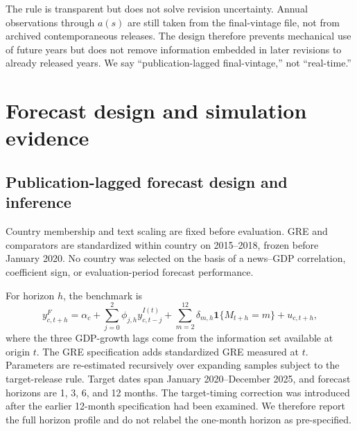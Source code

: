 \documentclass[preprint,12pt,authoryear]{elsarticle}
\begin{document}
The rule is transparent but does not solve revision uncertainty. Annual
observations through $a(s)$ are still taken from the final-vintage file, not
from archived contemporaneous releases. The design therefore prevents
mechanical use of future years but does not remove information embedded in
later revisions to already released years. We say ``publication-lagged
final-vintage,'' not ``real-time.''

\section{Forecast design and simulation evidence}

\subsection{Publication-lagged forecast design and inference}

Country membership and text scaling are fixed before evaluation. GRE and
comparators are standardized within country on 2015--2018, frozen before
January 2020. No country was selected on the basis of a news--GDP correlation,
coefficient sign, or evaluation-period forecast performance.

For horizon $h$, the benchmark is
\begin{equation}
y^F_{c,t+h} = \alpha_c + \sum_{j=0}^{2}\phi_{j,h} y^{I(t)}_{c,t-j}
+ \sum_{m=2}^{12}\delta_{m,h}\mathbf{1}\{M_{t+h}=m\} + u_{c,t+h},
\label{eq:benchmark}
\end{equation}
where the three GDP-growth lags come from the information set available at
origin $t$. The GRE specification adds standardized GRE measured at $t$.
Parameters are re-estimated recursively over expanding samples subject to the
target-release rule. Target dates span January 2020--December 2025, and
forecast horizons are 1, 3, 6, and 12 months. The target-timing correction was
introduced after the earlier 12-month specification had been examined. We
therefore report the full horizon profile and do not relabel the one-month
horizon as pre-specified.


\end{document}
